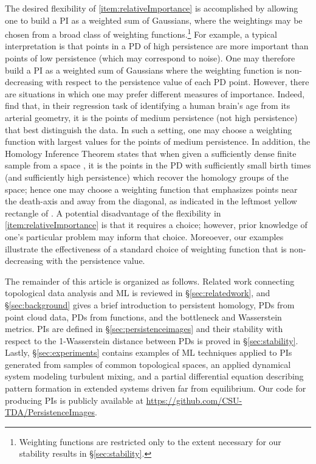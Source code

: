 \documentclass[11pt]{article}
\begin{document}
The desired flexibility of \ref{item:relativeImportance} is accomplished by allowing one to build a PI as a weighted sum of Gaussians, where the weightings may be chosen from a broad class of weighting functions.\footnote{Weighting functions are restricted only to the extent necessary for our stability results in \S\ref{sec:stability}.} For example, a typical interpretation is that points in a PD of high persistence are more important than points of low persistence (which may correspond to noise). One may therefore build a PI as a weighted sum of Gaussians where the weighting function is non-decreasing with respect to the persistence value of each PD point. However, there are situations in which one may prefer different measures of importance. Indeed, \citet{bendich2014persistent} find that, in their regression task of identifying a human brain's age from its arterial geometry, it is the points of medium persistence (not high persistence) that best distinguish the data. In such a setting, one may choose a weighting function with largest values for the points of medium persistence. In addition, the Homology Inference Theorem \citep{stabilityPD} states that when given a sufficiently dense finite sample from a space , it is the points in the PD with sufficiently small birth times (and sufficiently high persistence) which recover the homology groups of the space; hence one may choose a weighting function that emphasizes points near the death-axis and away from the diagonal, as indicated in the leftmost yellow rectangle of \citet[Figure~2.4]{bendichThesis}. A potential disadvantage of the flexibility in \ref{item:relativeImportance} is that it requires a choice; however, prior knowledge of one's particular problem may inform that choice.  Moreoever, our examples illustrate the effectiveness of a standard choice of weighting function that is non-decreasing with the persistence value.
   
The remainder of this article is organized as follows. Related work connecting topological data analysis and ML is reviewed in \S\ref{sec:relatedwork}, and \S\ref{sec:background} gives a brief introduction to persistent homology, PDs from point cloud data, PDs from functions, and the bottleneck and Wasserstein metrics. PIs are defined in \S\ref{sec:persistenceimages} and their stability with respect to the 1-Wasserstein distance between PDs is proved in \S\ref{sec:stability}.  Lastly,  \S\ref{sec:experiments} contains examples of ML techniques applied to PIs generated from samples of common topological spaces, an applied dynamical system modeling turbulent mixing, and a partial differential equation describing pattern formation in extended systems driven far from equilibrium. Our code for producing PIs is publicly available at \url{https://github.com/CSU-TDA/PersistenceImages}.
\end{document}
